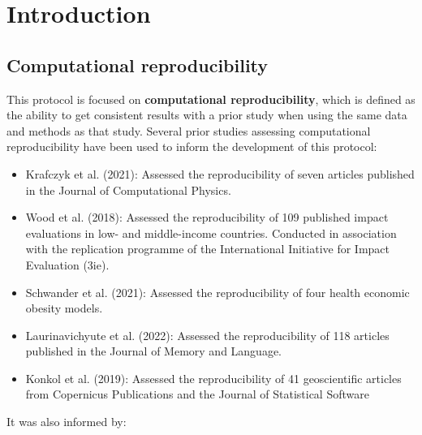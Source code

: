 \vspace{1cm}
\section{Introduction}

\subsection{Computational reproducibility}

This protocol is focused on \textbf{computational reproducibility}, which is defined as the ability to get consistent results with a prior study when using  the same data and methods as that study.\autocite{national_academies_of_sciences_engineering_and_medicine_reproducibility_2019} Several prior studies assessing computational reproducibility have been used to inform the development of this protocol:

\begin{itemize}
    \item Krafczyk et al. (2021):\autocite{krafczyk_learning_2021} Assessed the reproducibility of seven articles published in the Journal of Computational Physics.
    \item Wood et al. (2018):\autocite{wood_push_2018,wood_replication_2018} Assessed the reproducibility of 109 published impact evaluations in low- and middle-income countries. Conducted in association with the replication programme of the International Initiative for Impact Evaluation (3ie).
    \item Schwander et al. (2021):\autocite{schwander_replication_2021} Assessed the reproducibility of four health economic obesity models.
    \item Laurinavichyute et al. (2022):\autocite{laurinavichyute_share_2022} Assessed the reproducibility of 118 articles published in the Journal of Memory and Language.
    \item Konkol et al. (2019):\autocite{konkol_computational_2019} Assessed the reproducibility of 41 geoscientific articles from Copernicus Publications and the Journal of Statistical Software
\end{itemize}

It was also informed by:

